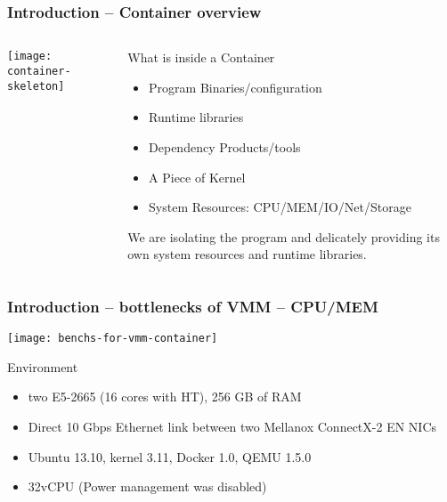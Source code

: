 \begin{frame}[plain]
	\frametitle{Introduction -- Container overview }
	
	
	\begin{columns}
		
		\begin{column}{.4\textwidth}
			\centering
			
			\texttt{[image: container-skeleton]}
		\end{column}
		
		\begin{column}{.6\textwidth}
			\Large
			What is inside a Container
			\begin{itemize}
				\item Program Binaries/configuration
				\item Runtime libraries
				\item Dependency Products/tools
				\item A Piece of Kernel
				\item System Resources: CPU/MEM/IO/Net/Storage
				
			\end{itemize}	
			We are isolating the program and delicately providing its own system resources and runtime libraries.
		\end{column}
		
	\end{columns}
	
	
\end{frame}

\begin{frame}[plain]
	\frametitle{Introduction -- bottlenecks of VMM -- CPU/MEM}
	
			\texttt{[image: benchs-for-vmm-container]}


			\large
			Environment
			\begin{itemize}
				\item two E5-2665 (16 cores with HT),  256 GB of RAM
				\item Direct 10 Gbps Ethernet link between
				two Mellanox ConnectX-2 EN NICs
				\item Ubuntu 13.10, kernel 3.11, Docker 1.0, QEMU 1.5.0
				\item 32vCPU (Power management was disabled)
			\end{itemize}	
	
\end{frame}


